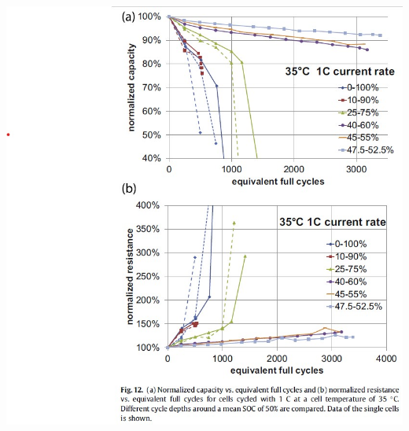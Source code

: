 \documentclass{article}
\begin{document}
\hfil\includegraphics[scale=0.5]{images/Ecker_2014_fig12.jpg}
\end{document}
